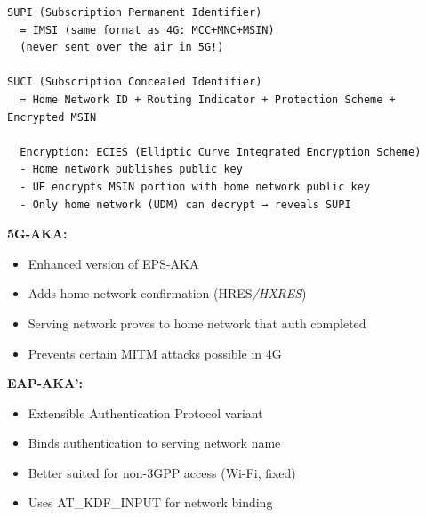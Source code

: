 
\def\CNcodelang{}

\begin{CNplaincode}
\begin{Verbatim}
SUPI (Subscription Permanent Identifier)
  = IMSI (same format as 4G: MCC+MNC+MSIN)
  (never sent over the air in 5G!)

SUCI (Subscription Concealed Identifier)
  = Home Network ID + Routing Indicator + Protection Scheme + Encrypted MSIN
  
  Encryption: ECIES (Elliptic Curve Integrated Encryption Scheme)
  - Home network publishes public key
  - UE encrypts MSIN portion with home network public key
  - Only home network (UDM) can decrypt → reveals SUPI
\end{Verbatim}
\end{CNplaincode}


\textbf{5G-AKA:}

\begin{itemize}
\tightlist
\item
  Enhanced version of EPS-AKA
\item
  Adds home network confirmation (HRES\emph{/\allowbreak{}HXRES})
\item
  Serving network proves to home network that auth completed
\item
  Prevents certain MITM attacks possible in 4G
\end{itemize}

\textbf{EAP-AKA’:}

\begin{itemize}
\tightlist
\item
  Extensible Authentication Protocol variant
\item
  Binds authentication to serving network name
\item
  Better suited for non-3GPP access (Wi-Fi, fixed)
\item
  Uses AT\_\allowbreak{}KDF\_\allowbreak{}INPUT for network binding
\end{itemize}



